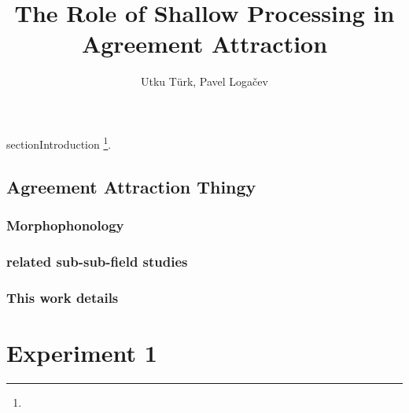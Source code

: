 \documentclass[a4paper,man,natbib]{apa6}\usepackage[]{graphicx}\usepackage[]{color}
\title{The Role of Shallow Processing in Agreement Attraction}
\author{Utku Türk, Pavel Loga\v{c}ev}
\affiliation{Boğaziçi University}
\begin{document}
\maketitle


section{Introduction} \label{sec:Intro}
\footnote{\printglossaries}. %
\subsection{Agreement Attraction Thingy} \label{sec:Intro:literature}
\subsubsection{Morphophonology} \label{sec:Intro:literature:morphophonology}


\subsubsection{related sub-sub-field studies} \label{sec:Intro:literature:others}

\subsubsection{This work details} \label{sec:Intro:literature:thiswork}





\section{Experiment 1} \label{sec:exp1}
\end{document}

